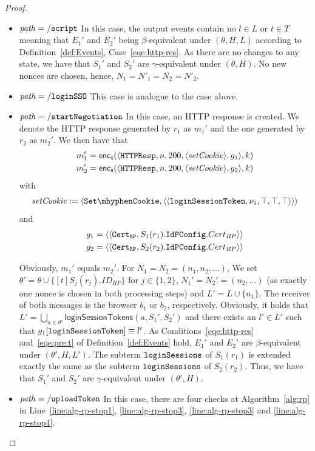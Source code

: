 \begin{proof}
    \begin{itemize}
      \item $\mathit{path} = \mathtt{/script}$ In this case, 
        the output events contain no $l\in L$ or $t\in T$ 
        meaning that $E_1'$ and $E_2'$ being $\beta$-equivalent
        under $(\theta,H,L)$ according to 
        Definition~\ref{def:Events}, Case~\ref{eqe:http-res}. As
        there are no changes to any state, we have that $S_1'$ 
        and $S_2'$ are $\gamma$-equivalent under $(\theta,H)$. 
        No new nonces are chosen, hence, 
        $N_1 = N'_1 = N_2 = N'_2$.
      \item $\mathit{path} = \mathtt{/loginSSO}$ This case is analogue
        to the case above.
      \item $\mathit{path} = \mathtt{/startNegotiation}$ In this case, 
        an HTTP response is created. We denote the HTTP response generated by $r_1$ as $m_1'$ and the one
        generated by $r_2$ as $m_2'$. We then have that
        \begin{align*}
          m_1' = \mathsf{enc}_\mathsf{s}(\langle\mathtt{HTTPResp},n,200,\langle\mathit{setCookie}\rangle,g_1\rangle,k) \\
          m_2' = \mathsf{enc}_\mathsf{s}(\langle\mathtt{HTTPResp},n,200,\langle\mathit{setCookie}\rangle,g_2\rangle,k)
        \end{align*}
        with
        \begin{align*}
          \mi{setCookie} := \myangle{\cSetCookie, \myangle{\myangle{\str{loginSessionToken}, \nu_1, \True, \True, \True}}} \\
        \end{align*}
        and 
        \begin{align*}
          g_1 = \langle\langle\mathtt{Cert_{RP}},S_1(r_1).\mathtt{IdPConfig}.Cert_{RP}\rangle\rangle \\
          g_2 = \langle\langle\mathtt{Cert_{RP}},S_2(r_2).\mathtt{IdPConfig}.Cert_{RP}\rangle\rangle
        \end{align*}
  
        Obviously, $m_1'$ equals $m_2'$. For $N_1 = N_2 = 
        (n_1, n_2, \dots)$, We set $\theta' = \theta \cup 
        \{ [t]S_j(r_j).ID_{RP} \}$ for $j\in \{1, 2\}$, 
        $N_1' = N_2' = (n_2, \dots)$ (as exactly one nonce is 
        chosen in both processing steps) and 
        $L' = L \cup \{n_1\}$. 
        The receiver of both messages is the browser $b_1$ or 
        $b_2$, respectively. Obviously, it holds that
        $L' = \bigcup_{a\in\theta'} 
        \mathsf{loginSessionTokens}(a,S_1',S_2')$
        and there exists an $l' \in L'$ such that
        $g_1[\mathtt{loginSessionToken}] \equiv l'$. As
        Conditions~\ref{eqe:http-res} and~\ref{eqe:pre:t} of
        Definition~\ref{def:Events} hold, $E_1'$ and $E_2'$ are
        $\beta$-equivalent under $(\theta',H,L')$. The subterm
        $\mathtt{loginSessions}$ of $S_1(r_1)$ is extended exactly 
        the same as the subterm $\mathtt{loginSessions}$ of 
        $S_2(r_2)$. Thus, we have that $S_1'$ and $S_2'$ are
        $\gamma$-equivalent under $(\theta',H)$.
      \item $\mathit{path} = \mathtt{/uploadToken}$ In this case, 
        there are four checks at Algorithm~\ref{alg:rp} in
        Line~\ref{line:alg-rp-stop1}, \ref{line:alg-rp-stop3}, 
        \ref{line:alg-rp-stop3} and \ref{line:alg-rp-stop4}.
        

\end{itemize}
\end{proof}
